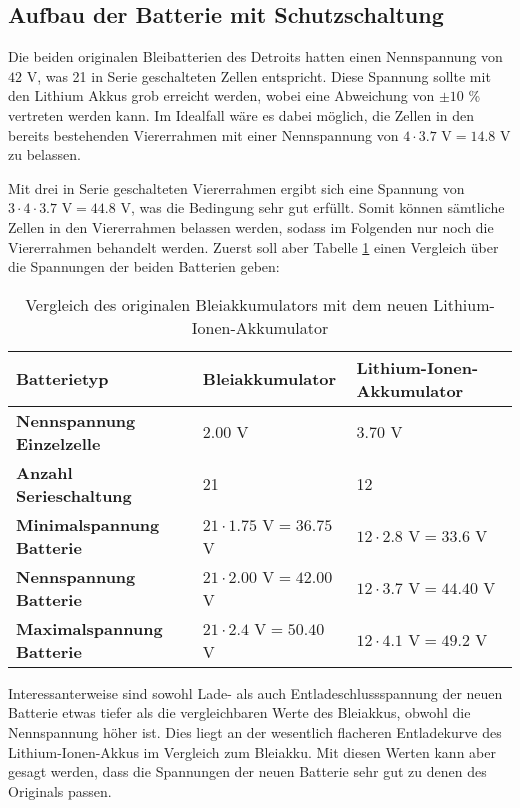 \subsection{Aufbau der Batterie mit Schutzschaltung}
Die beiden originalen Bleibatterien des Detroits hatten einen Nennspannung von $42$ V, was 21 in Serie geschalteten Zellen entspricht. Diese Spannung sollte mit den Lithium Akkus grob erreicht werden, wobei eine Abweichung von $\pm 10$ \% vertreten werden kann. Im Idealfall wäre es dabei möglich, die Zellen in den bereits bestehenden Viererrahmen mit einer Nennspannung von $4\cdot 3.7$ V$=14.8$ V zu belassen.

Mit drei in Serie geschalteten Viererrahmen ergibt sich eine Spannung von $3\cdot 4\cdot 3.7$ V$=44.8$ V, was die Bedingung sehr gut erfüllt. Somit können sämtliche Zellen in den Viererrahmen belassen werden, sodass im Folgenden nur noch die Viererrahmen behandelt werden. Zuerst soll aber Tabelle \ref{tab:bat_vergl} einen Vergleich über die Spannungen der beiden Batterien geben:

\begin{table}[h]
\centering
\begin{tabular}{|l|l|l|}
\hline
\textbf{Batterietyp}              & \textbf{Bleiakkumulator} & \textbf{Lithium-Ionen-Akkumulator} \\ \hline
\textbf{Nennspannung Einzelzelle} & $2.00$ V                            & $3.70$ V                                    \\ \hline
\textbf{Anzahl Serieschaltung}    & 21                                  & 12                                          \\ \hline
\textbf{Minimalspannung Batterie} & $21\cdot1.75$ V$=36.75$ V           & $12\cdot2.8$ V$=33.6$ V                     \\ \hline
\textbf{Nennspannung Batterie}    & $21\cdot2.00$ V$=42.00$ V           & $12\cdot3.7$ V$=44.40$ V                    \\ \hline
\textbf{Maximalspannung Batterie} & $21\cdot2.4$ V$=50.40$ V            & $12\cdot4.1$ V$=49.2$ V                     \\ \hline
\end{tabular}
\caption{Vergleich des originalen Bleiakkumulators mit dem neuen Lithium-Ionen-Akkumulator}
\label{tab:bat_vergl}
\end{table}

Interessanterweise sind sowohl Lade- als auch Entladeschlussspannung der neuen Batterie etwas tiefer als die vergleichbaren Werte des Bleiakkus, obwohl die Nennspannung höher ist. Dies liegt an der wesentlich flacheren Entladekurve des Lithium-Ionen-Akkus im Vergleich zum Bleiakku. Mit diesen Werten kann aber gesagt werden, dass die Spannungen der neuen Batterie sehr gut zu denen des Originals passen.